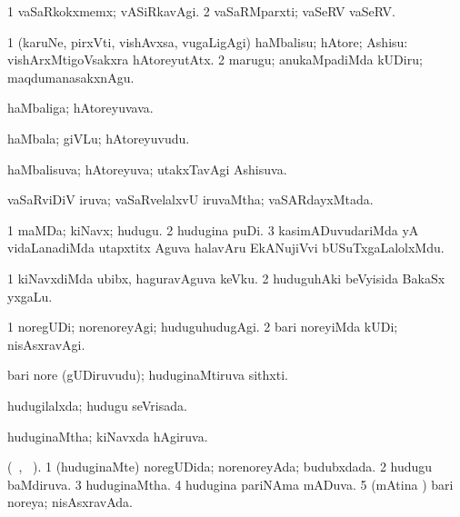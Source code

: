 \bentry
{} 
\gl{\kirxvi}
\bmng
\bnum
\num{1} vaSaRkokxmemx; vASiRkavAgi. 
\num{2} vaSaRMparxti; vaSeRV  vaSeRV.
\enum
\emng
\eentry

\bentry
{} 
\gl{\akirx} 
\bmng
\bnum
\num{1} (karuNe, pirxVti, vishAvxsa, \mo vugaLigAgi) haMbalisu; hAtore; Ashisu:  vishArxMtigoVsakxra hAtoreyutAtx. 
\num{2} marugu; anukaMpadiMda kUDiru; maqdumanasakxnAgu.
\enum
\emng
\eentry

\bentry
{} 
\gl{\nA} 
\bmng
haMbaliga; hAtoreyuvava.
\emng
\eentry

\bentry
{} 
\gl{\nA} 
\bmng
haMbala; giVLu; hAtoreyuvudu.
\emng
\eentry

\bentry
{} 
\gl{\gu} 
\bmng
haMbalisuva; hAtoreyuva; utakxTavAgi Ashisuva.
\emng
\eentry

\bentry
{} 
\gl{\gu} 
\bmng
vaSaRviDiV iruva; vaSaRvelalxvU iruvaMtha; vaSARdayxMtada.
\emng
\eentry 

\bentry
{} 
\gl{\nA} 
\bmng
\bnum
\num{1} maMDa; kiNavx; hudugu. 
\num{2} hudugina puDi. 
\num{3} kasimADuvudariMda yA vidaLanadiMda utapxtitx Aguva halavAru EkANujiVvi bUSuTxgaLalolxMdu.
\enum
\emng 

\noindent	
\gl{\pagu} 
\bmng
\bnum
\num{1}  kiNavxdiMda  ubibx, haguravAguva keVku. 
\num{2}  huduguhAki beVyisida BakaSx yxgaLu.
\enum
\emng
\eentry

\bentry
{} 
\gl{\kirxvi} 
\bmng
\bnum
\num{1} noregUDi; norenoreyAgi; huduguhudugAgi. 
\num{2} bari noreyiMda kUDi; nisAsxravAgi.
\enum
\emng
\eentry

\bentry
{} 
\gl{\nA} 
\bmng
bari nore (gUDiruvudu); huduginaMtiruva sithxti.
\emng
\eentry

\bentry
{} 
\gl{\gu} 
\bmng
hudugilalxda; hudugu seVrisada.
\emng
\eentry

\bentry
{} 
\gl{\gu} 
\bmng
huduginaMtha; kiNavxda hAgiruva.
\emng
\eentry

\bentry
{} 
\gl{\gu} 
\bmng
(\tara\ , \tama\ ).  
\bnum
\num{1} (huduginaMte) noregUDida; norenoreyAda; budubxdada. 
\num{2} hudugu baMdiruva. 
\num{3} huduginaMtha. 
\num{4} hudugina pariNAma mADuva. 
\num{5} (mAtina \vi) bari noreya; nisAsxravAda.
\enum
\emng
\eentry

